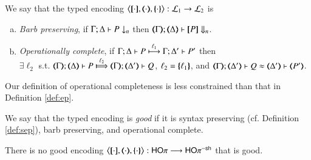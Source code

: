 \begin{definition}\label{d:bpoc}
We say that 
	the typed encoding
		$\enco{\map{\cdot}, \mapt{\cdot}, \mapa{\cdot}}: \tyl{L}_1 \to \tyl{L}_2$ is 
		\begin{enumerate}[(a)]
\item  \emph{Barb preserving}, %
if 
$\Gamma; \Delta \proves P \barb{n}$
then 
$\mapt{\Gamma}; \mapt{\Delta} \proves \map{P} \Barb{n}$.

			\item	\emph{Operationally complete},  
				if  $\stytra{\Gamma}{\ell_1}{\Delta}{P}{\Delta'}{P'}$
				then \\ $\exists \ell_2$ s.t. 
				$\wtytra{\mapt{\Gamma}}{\ell_2}{\mapt{\Delta}}{P}{\mapt{\Delta'}}{Q}$,
				$\ell_2 = \mapa{\ell_1}$,
				and
				$\horel{\mapt{\Gamma}}{\mapt{\Delta'}}{Q}{\wb}{\mapt{\Delta'}}{\mapt{P'}}$.

\end{enumerate}
\end{definition}

Our definition of operational completeness is 
less constrained than that 
in 
Definition \ref{def:ep}.

\begin{definition}\label{def:basenc}
We say that 
	the typed encoding 
is	\emph{good} 
	if it is syntax preserving 
	(cf. Definition \ref{def:sep}),
	barb preserving, and  operational complete.
\end{definition}



\begin{theorem}%
	There is no good encoding $\enco{\map{\cdot}, \mapt{\cdot}, \mapa{\cdot}}: \HOp \longrightarrow \HOp^{\minussh}$
	that is good.
\end{theorem}

